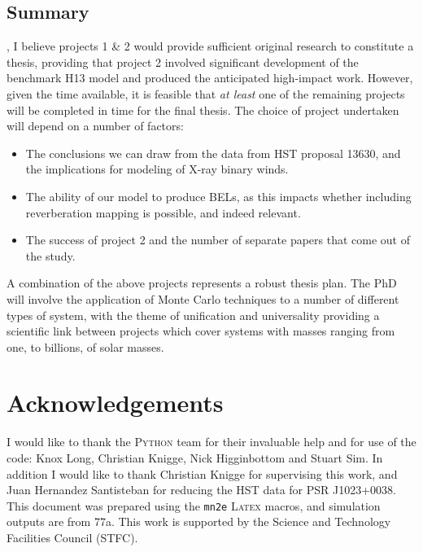 \documentclass[useAMS,usenatbib,onecolumn]{mn2e2}
\begin{document}
\bigskip

\subsection{Summary}
, I believe projects 1 \& 2 would provide sufficient 
original research to constitute a thesis, providing that project 2 involved significant development
of the benchmark H13 model and produced the anticipated high-impact work. 
However, given the time available, it is feasible that {\sl at least} one of the remaining projects 
will be completed in time for the final thesis. The choice of project undertaken will depend on a number of factors:

\begin{itemize}
 	\item The conclusions we can draw from the data from HST proposal 13630, and the implications for 
 	      modeling of X-ray binary winds.
 	\item The ability of our model to produce BELs, as this impacts whether including reverberation mapping is
 	      possible, and indeed relevant.
 	\item The success of project 2 and the number of separate papers that come out of the study. 
 \end{itemize} 

A combination of the above projects represents a robust thesis plan.
The PhD will involve the application of Monte Carlo techniques to a number of different types of system, 
with the theme of unification and universality providing a scientific link between projects which 
 cover systems with masses ranging from one, to billions, of solar masses.





\section*{Acknowledgements}
I would like to thank the \textsc{Python} team for their invaluable help and for use of the code: Knox Long, Christian Knigge, Nick Higginbottom and Stuart Sim. In addition I would like to thank Christian Knigge for supervising this work, and Juan Hernandez Santisteban for reducing the HST data for PSR J1023+0038. This document was prepared using the \texttt{mn2e} \textsc{Latex} macros, and simulation outputs are from \py 77a. This work is supported by the Science and Technology Facilities Council (STFC).



\newpage
\end{document}
